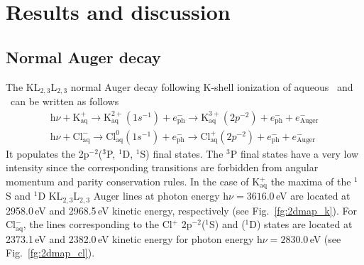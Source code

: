 \section{Results and discussion}\label{sec:rnd}

\subsection{Normal Auger decay}\label{ssec:na}

The KL$_{2,3}$L$_{2,3}$ normal Auger decay following K-shell ionization of aqueous \ki~and \cli~can be written as follows
%
\begin{align*}
\text{h}\nu + \text{K}^{+}_{\text{aq}} \rightarrow 
	\text{K}^{2+}_{\text{aq}} (1s^{-1}) + e^{-}_{\text{ph}}\rightarrow
	\text{K}^{3+}_{\text{aq}} (2p^{-2}) + e^{-}_{\text{ph}} + e^{-}_{\text{Auger}}\\
\text{h}\nu + \text{Cl}^{-}_{\text{aq}} \rightarrow
	\text{Cl}^{0}_{\text{aq}} (1s^{-1}) + e^{-}_{\text{ph}}\rightarrow
	\text{Cl}^{+}_{\text{aq}}(2p^{-2}) + e^{-}_{\text{ph}} + e^{-}_{\text{Auger}}
\end{align*}
%
It populates the 2p$^{-2}$($^3$P, $^1$D, $^1$S) final states. The $^3$P final states have a very low intensity since the corresponding transitions are forbidden from angular momentum and parity conservation rules. %
In the case of K$^{+}_{\text{aq}}$ the maxima of the $^1$S and $^1$D KL$_{2,3}$L$_{2,3}$ Auger lines at photon energy h$\nu = 3616.0$\,eV are located at 2958.0\,eV and 2968.5\,eV kinetic energy, respectively (see Fig.\ \ref{fg:2dmap_k}). For Cl$^{-}_{\text{aq}}$, the lines corresponding to the Cl$^{+}$ 2p$^{-2}$($^1$S) and ($^1$D) states are located at 2373.1\,eV and 2382.0\,eV kinetic energy for photon energy h$\nu = 2830.0$\,eV (see Fig.\ \ref{fg:2dmap_cl}).


